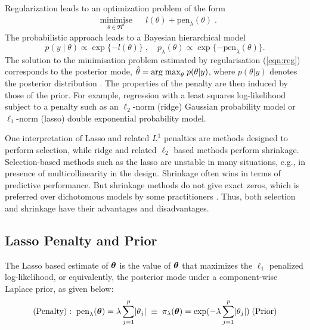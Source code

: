 \documentclass[11pt]{article}
\begin{document}
Regularization leads to an optimization problem of the form 
\begin{equation}
\label{eqn:reg}
\begin{aligned}
& \underset{\theta \in \Re^d}{\text{minimise}}
& & l(\theta) + \text{pen}_{\lambda}(\theta) \; . 
\end{aligned}
\end{equation}
The probabilistic approach leads to a Bayesian hierarchical model
\begin{equation}
p(y \mid \theta) \propto \exp\{-l(\theta)\} \; , \quad p_{\lambda}(\theta) \propto \exp\{ -\text{pen}_{\lambda}(\theta) \}. \label{eq:pen}
\end{equation}
The solution to the minimisation problem estimated by regularisation (\ref{eqn:reg}) corresponds to the posterior mode, $ \hat{\theta} = {\rm arg \; max}_\theta \; p( \theta|y) $, where $ p(\theta|y)$ denotes the posterior distribution \citep{polson2015mixtures}. The properties of the penalty are then induced by those of the prior. For example, regression with a least squares log-likelihood subject to a penalty such as an $\ell_2$-norm (ridge) \citep{hoerl70} Gaussian probability model or $\ell_1$-norm (lasso) \citep{tibshirani96} double exponential probability model. 

One interpretation of Lasso and related $L^1$ penalties are methods designed to perform selection, while ridge and related $\ell_2$ based methods perform shrinkage. Selection-based methods such as the lasso are unstable in many situations, e.g., in presence of multicollinearity in the design. Shrinkage often wins in terms of predictive performance. But shrinkage methods do not give exact zeros, which is preferred over dichotomous models by some practitioners \citep{stephens2009bayesian}. Thus, both selection and shrinkage have their advantages and disadvantages. 

\subsection{Lasso Penalty and Prior}\label{sec:lasso}

The Lasso based estimate of $\boldsymbol{\theta}$ is the value of $\boldsymbol{\theta}$ that maximizes the $\ell_1$ penalized log-likelihood, or equivalently, the posterior mode under a component-wise Laplace prior, as given below: 
\begin{equation}
(\text{Penalty}): \; \text{pen}_{\lambda}(\boldsymbol{\theta}) = \lambda \sum_{j = 1}^{p} \lvert\theta_j\rvert \; \equiv \; \pi_{\lambda}(\boldsymbol{\theta}) = \exp( - \lambda \sum_{j = 1}^{p} \lvert\theta_j\rvert) \; (\text{Prior})
\end{equation}
\end{document}
